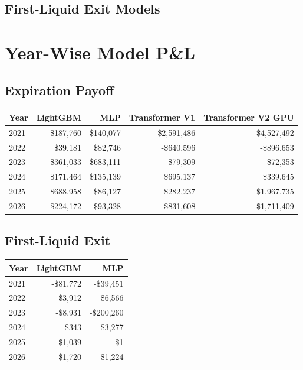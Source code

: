 \documentclass[11pt]{article}
\begin{document}
\subsection{First-Liquid Exit Models}
\begin{table}[H]
\centering
{}
\end{table}

\section{Year-Wise Model P\&L}
\subsection{Expiration Payoff}
\begin{table}[H]
\centering
\small
\begin{tabular}{lrrrr}
\toprule
Year & LightGBM & MLP & Transformer V1 & Transformer V2 GPU \\
\midrule
2021 & \$187,760 & \$140,077 & \$2,591,486 & \$4,527,492 \\
2022 & \$39,181 & \$82,746 & -\$640,596 & -\$896,653 \\
2023 & \$361,033 & \$683,111 & \$79,309 & \$72,353 \\
2024 & \$171,464 & \$135,139 & \$695,137 & \$339,645 \\
2025 & \$688,958 & \$86,127 & \$282,237 & \$1,967,735 \\
2026 & \$224,172 & \$93,328 & \$831,608 & \$1,711,409 \\
\bottomrule
\end{tabular}
\end{table}

\subsection{First-Liquid Exit}
\begin{table}[H]
\centering
\small
\begin{tabular}{lrr}
\toprule
Year & LightGBM & MLP \\
\midrule
2021 & -\$81,772 & -\$39,451 \\
2022 & \$3,912 & \$6,566 \\
2023 & -\$8,931 & -\$200,260 \\
2024 & \$343 & \$3,277 \\
2025 & -\$1,039 & -\$1 \\
2026 & -\$1,720 & -\$1,224 \\
\bottomrule
\end{tabular}
\end{table}
\end{document}
